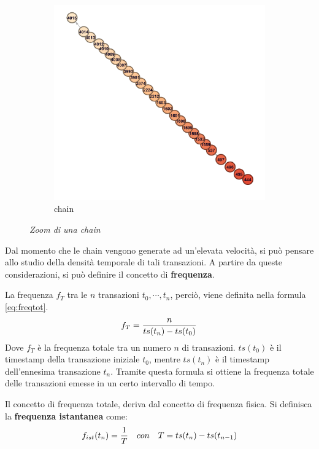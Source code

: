 \begin{figure}[htbp]
\begin{subfigure}[b]{0.4 \textwidth}
		\includegraphics[width=\textwidth]{figure/zoomchain2}
		\caption{chain}
		\label{fig:zoomchain2}
	\end{subfigure}
	\caption{\textit{Zoom di una chain}}\label{fig:zoomchain}
\end{figure}

Dal momento che le chain vengono generate ad un'elevata velocità, si può pensare allo studio della densità temporale di tali transazioni. A partire da queste considerazioni, si può definire il concetto di \textbf{frequenza}.

La frequenza $f_T$ tra le $n$ transazioni $t_0,\cdots,t_n$, perciò, viene definita nella formula \ref{eq:freqtot}.
\begin{equation}
\centering
f_T = \frac{n}{ts(t_n) - ts(t_0)}
\label{eq:freqtot}
\end{equation}
Dove $f_T$ è la frequenza totale tra un numero $n$ di transazioni. $ts(t_0)$ è il timestamp della transazione iniziale $t_0$, mentre $ts(t_n)$ è il timestamp dell'ennesima transazione $t_n$. Tramite questa formula si ottiene la frequenza totale delle transazioni emesse in un certo intervallo di tempo.

Il concetto di frequenza totale, deriva dal concetto di frequenza fisica. Si definisca la \textbf{frequenza istantanea} come:
\begin{equation}
\centering
f_{ist}(t_n) = \frac{1}{T}
\quad con \quad
T = ts(t_n) - ts(t_{n-1})
\label{eq:freqist}
\end{equation}

